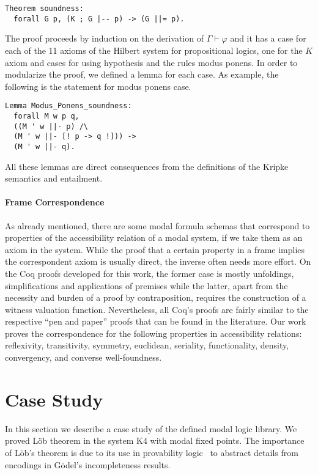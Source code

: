\documentclass[sigconf]{acmart}
\begin{document}
\begin{verbatim}
Theorem soundness:
  forall G p, (K ; G |-- p) -> (G ||= p).
\end{verbatim}

The proof proceeds by induction on the derivation of $\Gamma \vdash\varphi$ and
it has a case for each of the 11 axioms of the Hilbert system for propositional
logics, one for the $K$ axiom and cases for using hypothesis and the rules modus
ponens. In order to modularize the proof, we defined a lemma for each case.
As example, the following is the statement for modus ponens case.
\begin{verbatim}
Lemma Modus_Ponens_soundness:
  forall M w p q,
  ((M ' w ||- p) /\
  (M ' w ||- [! p -> q !])) ->
  (M ' w ||- q).
\end{verbatim}
All these lemmas are direct consequences from the definitions of the Kripke
semantics and entailment.

\paragraph{Frame Correspondence} 
As already mentioned, there are some modal formula schemas that correspond
to properties of the accessibility relation of a modal system, if we take them
as an axiom in the system.  While the proof that a certain property in a frame
implies the correspondent axiom is usually  direct, the inverse often needs
more effort. On the Coq proofs developed for this work,  the former case is
mostly unfoldings, simplifications and applications of premises
while the latter, apart from the necessity and burden of a proof by contraposition, 
requires the construction of a witness valuation function. 
Nevertheless, all Coq's proofs are fairly similar to the respective
``pen and paper'' proofs that  can be found in the literature. 
Our work proves the correspondence for the  following properties in
accessibility relations: reflexivity, transitivity, symmetry,  euclidean,
seriality, functionality, density, convergency, and converse well-foundness.

\section{Case Study}\label{sec:case}

In this section we describe a case study of the defined modal logic library.
We proved L\"ob theorem in the system K4 with modal fixed points.
The importance of L\"ob's theorem is due to its use in provability
logic~\cite{boolos_1994} to abstract details from encodings in G\"odel's
incompleteness results.
\end{document}
